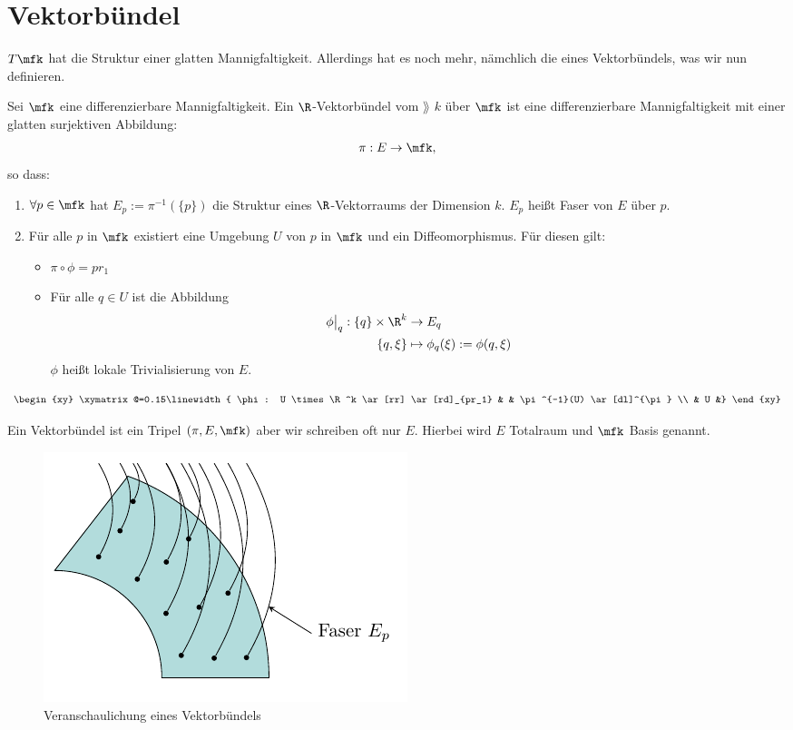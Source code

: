 \section{Vektorbündel}
$T\mfk$ hat die Struktur einer glatten Mannigfaltigkeit.
Allerdings hat es noch mehr, nämchlich die eines Vektorbündels, was wir nun definieren.
\begin{defs}[Vektorbündel]
Sei $\mfk$ eine differenzierbare Mannigfaltigkeit.
Ein $\R$-Vektorbündel vom $\rang$ $k$ über $\mfk$ ist eine differenzierbare Mannigfaltigkeit mit einer glatten surjektiven Abbildung:
\begin{align}
\pi: E \to \mfk,
\end{align}
so dass:
\begin{enumerate}
\item $\forall p \in \mfk$ hat $E_p:= \pi^{-1}( \{ p \})$ die Struktur eines $\R$-Vektorraums der Dimension $k$.
$E_p$ heißt Faser von $E$ über $p$.
\item Für alle $p$ in $\mfk$ existiert eine Umgebung $U$ von $p$ in $\mfk$ und ein Diffeomorphismus.
Für diesen gilt:
\begin{itemize}
\item $\pi \circ \phi = p r_1$
\item Für alle $q \in U$ ist die Abbildung
\begin{align}
\phi\big\vert_q : \{ q \} \times \R^k &\to E_q\\
\{ q, \xi \} &\mapsto \phi_q (\xi) := \phi(q, \xi)
\end{align}
$\phi$ heißt lokale Trivialisierung von $E$.
\end{itemize}
\end{enumerate}
\begin{align}
\begin{xy}
\xymatrix@=0.15\linewidth{
      \phi: U \times \R^k \ar[rr] \ar[rd]_{pr_1}  &     &  \pi^{-1}(U) \ar[dl]^{\pi}  \\
                             &  U  &}
\end{xy}
\end{align}
\end{defs}
\begin{bem}
Ein Vektorbündel ist ein Tripel $(\pi, E, \mfk)$ aber wir schreiben oft nur $E$. Hierbei wird $E$ Totalraum und $\mfk$ Basis genannt.
\end{bem}
\begin{figure}[H]
\centering
\includegraphics[scale=1.1]{figures/tikz/vectorbundel.pdf}
\caption{Veranschaulichung eines Vektorbündels}
\label{img:tangentialbuendel}
\end{figure}
